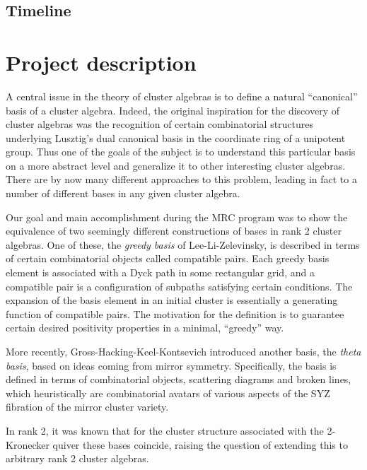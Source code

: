 \documentclass{amsart}
\begin{document}
  \subsection*{Timeline}

  \section*{Project description}

    A central issue in the theory of cluster algebras is to define a natural
    ``canonical'' basis of a cluster algebra.  Indeed, the original inspiration
    for the discovery of cluster algebras was the recognition of certain
    combinatorial structures underlying Lusztig's dual canonical basis in the
    coordinate ring of a unipotent group.  Thus one of the goals of the subject
    is to understand this particular basis on a more abstract level and
    generalize it to other interesting cluster algebras.  There are by now many
    different approaches to this problem, leading in fact to a number of
    different bases in any given cluster algebra.

    Our goal and main accomplishment during the MRC program  was to show the
    equivalence of two seemingly different constructions of bases in rank 2
    cluster algebras.  One of these, the \emph{greedy basis} of Lee-Li-Zelevinsky, is
    described in terms of certain combinatorial objects called compatible pairs.
    Each greedy basis element is associated with a Dyck path in some rectangular
    grid, and a compatible pair is a configuration of subpaths satisfying
    certain conditions.  The expansion of the basis element in an initial
    cluster is essentially a generating function of compatible pairs.  The
    motivation for the definition is to guarantee certain desired positivity
    properties in a minimal, ``greedy'' way.

    More recently, Gross-Hacking-Keel-Kontsevich introduced another basis, the
    \emph{theta basis}, based on ideas coming from mirror symmetry.  Specifically, the
    basis is defined in terms of combinatorial objects, scattering diagrams and
    broken lines, which heuristically are combinatorial avatars of various
    aspects of the SYZ fibration of the mirror cluster variety.  
    
    In rank 2, it was known that for the cluster structure associated with the
    2-Kronecker quiver these bases coincide, raising the question of extending
    this to arbitrary rank 2 cluster algebras.
\end{document}

